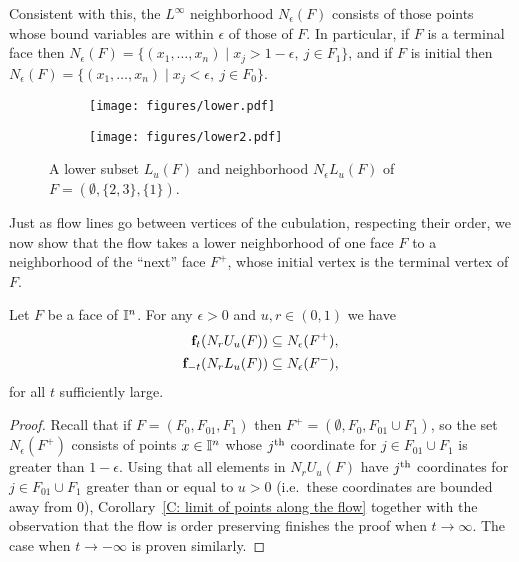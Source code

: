 Consistent with this, the $L^\infty$ neighborhood $N_\epsilon(F)$ consists of those points whose bound variables are within $\epsilon$ of those of $F$.
In particular, if $F$ is a terminal face then $N_\epsilon(F)=\{ (x_1,\ldots, x_n)\mid x_j>1-\epsilon,\ j\in F_1\}$, and if $F$ is initial then $N_\epsilon(F)=\{ (x_1,\ldots, x_n)\mid x_j<\epsilon,\ j\in F_0\}$.

\begin{figure}[!h]
	\centering
	\begin{subfigure}{.32\textwidth}
		\texttt{[image: figures/lower.pdf]}
		\hfill
	\end{subfigure}
	\begin{subfigure}{.32\textwidth}
		\hfill
		\texttt{[image: figures/lower2.pdf]}
	\end{subfigure}
	\caption{A lower subset $L_u(F)$ and neighborhood $N_\epsilon L_u(F)$ of $F = (\emptyset, \{2,3\}, \{1\})$.}
	\label{F: lower subspace and nbhd}
\end{figure}

Just as flow lines go between vertices of the cubulation, respecting their order, we now show that the flow takes a lower neighborhood of
 one face $F$ to a neighborhood of the ``next'' face $F^+$, 
whose initial vertex is the terminal vertex of $F$.

\begin{lemma} \label{L: flow to initial and terminal faces}
	Let $F$ be a face of $\mathbb{I}^n$. For any $\epsilon > 0$ and $u,r \in (0, 1)$ we have
	\begin{align*}
	\mathbf{f}_{t}(N_r U_u (F)) &\subseteq N_\epsilon (F^+), \\
	\mathbf{f}_{-t}(N_r L_u (F)) &\subseteq N_\epsilon (F^-),
	\end{align*}
	for all $t$ sufficiently large.
\end{lemma}

\begin{proof}
	Recall that if $F = (F_0, F_{01}, F_1)$ then $F^+ = (\emptyset, F_0, F_{01} \cup F_1)$, so the set $N_\epsilon (F^+)$ consists of points $x \in \mathbb{I}^n$ whose $j^{\mathrm{th}}$ coordinate for $j \in F_{01} \cup F_1$ is greater than $1-\epsilon$.
	Using that all elements in $N_r U_u (F)$ have $j^{\mathrm{th}}$ coordinates for $j \in F_{01} \cup F_1$ greater than or equal to $u > 0$ (i.e.\ these coordinates are bounded away from $0$), Corollary~\ref{C: limit of points along the flow} together with the observation that the flow is order preserving finishes the proof when $t \to \infty$.
	The case when $t \to -\infty$ is proven similarly.
\end{proof}

